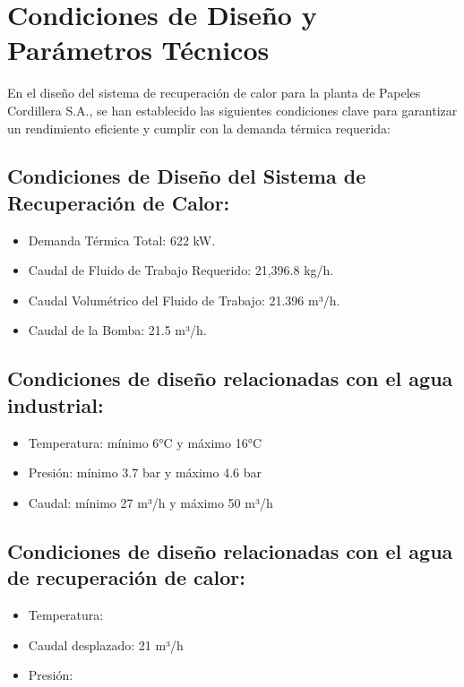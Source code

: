 \documentclass[11pt,a4paper]{article}  %
\begin{document}
\section{Condiciones de Diseño y Parámetros Técnicos}

En el diseño del sistema de recuperación de calor para la planta de Papeles Cordillera S.A., se han establecido las siguientes condiciones clave para garantizar un rendimiento eficiente y cumplir con la demanda térmica requerida:


\subsection{Condiciones de Diseño del Sistema de Recuperación de Calor:}
\begin{itemize}
        \item Demanda Térmica Total: 622 kW.
        \item Caudal de Fluido de Trabajo Requerido: 21,396.8 kg/h.
        \item Caudal Volumétrico del Fluido de Trabajo: 21.396 m³/h.
        \item Caudal de la Bomba: 21.5 m³/h.
\end{itemize}
\subsection{Condiciones de diseño relacionadas con el agua industrial:}

\begin{itemize}
        \item Temperatura: mínimo 6°C y máximo 16°C
        \item Presión: mínimo 3.7 bar y máximo 4.6 bar
        \item Caudal: mínimo 27 m³/h y máximo 50 m³/h
\end{itemize}

\subsection{Condiciones de diseño relacionadas con el agua de recuperación de calor:}

\begin{itemize}
        \item Temperatura:
        \item Caudal desplazado: 21 m³/h
        \item Presión: 

\end{itemize}
\end{document}
